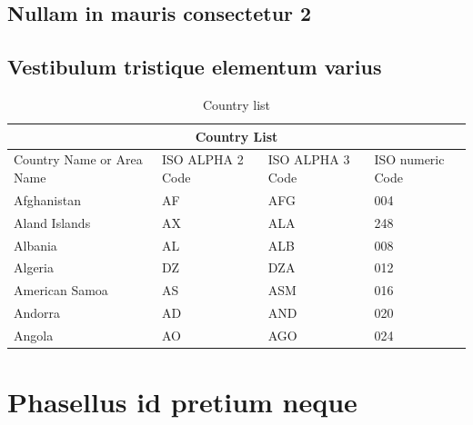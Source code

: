 \subsection{Nullam in mauris consectetur 2}
\blindtext
\blindenumerate

\subsection{Vestibulum tristique elementum varius}
\blindtext

\begin{table}[!ht]
	\caption{Country list}\label{t:1}
	\smallskip
	\centering

	\begin{tabular}{ |p{3cm}||p{3cm}|p{3cm}|p{3cm}|  }
		\hline
		\multicolumn{4}{|c|}{Country List} \\
		\hline
		Country Name or Area Name& ISO ALPHA 2 Code &ISO ALPHA 3 Code&ISO numeric Code\\
		\hline
		Afghanistan & AF & AFG & 004\\
		Aland Islands & AX & ALA & 248\\
		Albania & AL & ALB & 008\\
		Algeria & DZ & DZA & 012\\
		American Samoa & AS & ASM & 016\\
		Andorra & AD & AND & 020\\
		Angola & AO & AGO & 024\\
		\hline
	\end{tabular}
\end{table}


\section{Phasellus id pretium neque}
\Blindtext
